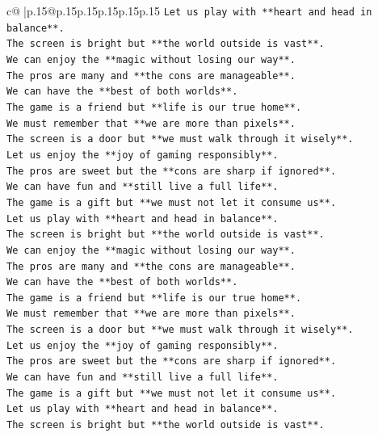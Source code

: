 \documentclass{article}
\begin{document}
{\begin{supertabular}{c@{$\;$}|p{.15\linewidth}@{}p{.15\linewidth}p{.15\linewidth}p{.15\linewidth}p{.15\linewidth}p{.15\linewidth}}
{{{\texttt{Let us play with **heart and head in balance**.} \\
\texttt{The screen is bright but **the world outside is vast**.} \\
\texttt{We can enjoy the **magic without losing our way**.} \\
\texttt{The pros are many and **the cons are manageable**.} \\
\texttt{We can have the **best of both worlds**.} \\
\texttt{The game is a friend but **life is our true home**.} \\
\texttt{We must remember that **we are more than pixels**.} \\
\texttt{The screen is a door but **we must walk through it wisely**.} \\
\texttt{Let us enjoy the **joy of gaming responsibly**.} \\
\texttt{The pros are sweet but the **cons are sharp if ignored**.} \\
\texttt{We can have fun and **still live a full life**.} \\
\texttt{The game is a gift but **we must not let it consume us**.} \\
\texttt{Let us play with **heart and head in balance**.} \\
\texttt{The screen is bright but **the world outside is vast**.} \\
\texttt{We can enjoy the **magic without losing our way**.} \\
\texttt{The pros are many and **the cons are manageable**.} \\
\texttt{We can have the **best of both worlds**.} \\
\texttt{The game is a friend but **life is our true home**.} \\
\texttt{We must remember that **we are more than pixels**.} \\
\texttt{The screen is a door but **we must walk through it wisely**.} \\
\texttt{Let us enjoy the **joy of gaming responsibly**.} \\
\texttt{The pros are sweet but the **cons are sharp if ignored**.} \\
\texttt{We can have fun and **still live a full life**.} \\
\texttt{The game is a gift but **we must not let it consume us**.} \\
\texttt{Let us play with **heart and head in balance**.} \\
\texttt{The screen is bright but **the world outside is vast**.} \\
}}}
\end{supertabular}}
\end{document}
